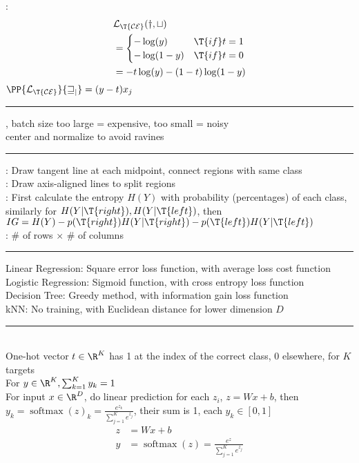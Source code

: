 \documentclass[10pt]{CheatSheet/hw}
\begin{document}
\begin{multicols*}{5}
: \begin{align*}
    &\cal{L}_{\T{CE}}(y,t)\\
    &=\begin{cases}
        -\log(y) & \T{if } t=1\\
        -\log(1-y) & \T{if } t=0
    \end{cases}\\
    &= -t\log(y)-(1-t)\log(1-y)
\end{align*}
$\PP{\cal{L}_{\T{CE}}}{w_j}=(y-t)x_j$\\
\rule{\linewidth}{0.4pt}
, batch size too large = expensive, too small = noisy\\
center and normalize to avoid ravines\\
\rule{\linewidth}{0.4pt}
: Draw tangent line at each midpoint, connect regions with same class\\
: Draw axis-aligned lines to split regions\\
: First calculate the entropy $H(Y)$ with probability (percentages) of each class, similarly for $H(Y|\T{right}),H(Y|\T{left})$, then $IG=H(Y)-p(\T{right})H(Y|\T{right})-p(\T{left})H(Y|\T{left})$\\
: \# of rows $\times$ \# of columns\\
\rule{\linewidth}{0.4pt}
Linear Regression: Square error loss function, with average loss cost function\\
Logistic Regression: Sigmoid function, with cross entropy loss function\\
Decision Tree: Greedy method, with information gain loss function\\
kNN: No training, with Euclidean distance for lower dimension $D$\\
\rule{\linewidth}{0.4pt}
\\
One-hot vector $t\in\R^K$ has 1 at the index of the correct class, 0 elsewhere, for $K$ targets\\
For $y\in\R^K, \sum_{k=1}^K y_k=1$\\
For input $x\in\R^D$, do linear prediction for each $z_i$, $z=Wx+b$, then $y_k=\operatorname{softmax}(z)_k=\frac{e^{z_k}}{\sum_{j=1}^K e^{z_j}}$, their sum is 1, each $y_k\in[0,1]$
\begin{align*}
    z&= Wx+b\\
    y&=\operatorname{softmax}(z)=\frac{e^z}{\textstyle\sum_{j=1}^K e^{z_j}}\\

\end{align*}
\end{multicols*}
\end{document}
